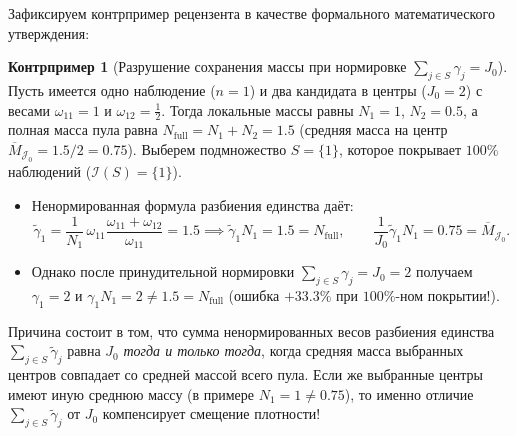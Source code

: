 \documentclass[11pt,a4paper]{article}
\newcommand{\II}{\mathcal{I}}
\newcommand{\JJJ}{\mathcal{J}}
\theoremstyle{definition}
\newtheorem{counterexample}[theorem]{Контрпример}
\theoremstyle{remark}
\begin{document}
Зафиксируем контрпример рецензента в качестве формального математического утверждения:

\begin{counterexample}[Разрушение сохранения массы при нормировке $\sum_{j \in S}\gamma_j = J_0$]\label{cex:pou_norm}
Пусть имеется одно наблюдение ($n = 1$) и два кандидата в центры ($J_0 = 2$) с весами $\omega_{11} = 1$ и $\omega_{12} = \frac{1}{2}$. Тогда локальные массы равны $N_1 = 1$, $N_2 = 0.5$, а полная масса пула равна $N_{\mathrm{full}} = N_1 + N_2 = 1.5$ (средняя масса на центр $\overline{M}_{\JJJ_0} = 1.5 / 2 = 0.75$). Выберем подмножество $S = \{1\}$, которое покрывает $100\%$ наблюдений ($\II(S) = \{1\}$).
\begin{itemize}
    \item Ненормированная формула разбиения единства даёт:
    \[
        \tilde{\gamma}_1 = \frac{1}{N_1}\,\omega_{11}\frac{\omega_{11} + \omega_{12}}{\omega_{11}} = 1.5 \implies \tilde{\gamma}_1 N_1 = 1.5 = N_{\mathrm{full}}, \qquad \frac{1}{J_0}\tilde{\gamma}_1 N_1 = 0.75 = \overline{M}_{\JJJ_0}.
    \]
    \item Однако после принудительной нормировки $\sum_{j \in S}\gamma_j = J_0 = 2$ получаем $\gamma_1 = 2$ и $\gamma_1 N_1 = 2 \neq 1.5 = N_{\mathrm{full}}$ (ошибка $+33.3\%$ при $100\%$-ном покрытии!).
\end{itemize}
Причина состоит в том, что сумма ненормированных весов разбиения единства $\sum_{j \in S}\tilde{\gamma}_j$ равна $J_0$ \emph{тогда и только тогда}, когда средняя масса выбранных центров совпадает со средней массой всего пула. Если же выбранные центры имеют иную среднюю массу (в примере $N_1 = 1 \neq 0.75$), то именно отличие $\sum_{j \in S}\tilde{\gamma}_j$ от $J_0$ компенсирует смещение плотности!
\end{counterexample}
\end{document}

